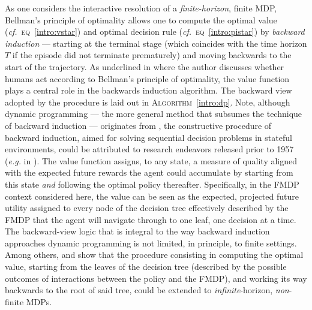 As one considers the interactive resolution of a \emph{finite-horizon}, finite MDP,
Bellman's principle of optimality allows one to compute the optimal value
(\textit{cf.}~\textsc{eq}~\ref{intro:vstar})
and optimal decision rule
(\textit{cf.}~\textsc{eq}~\ref{intro:pistar})
by \emph{backward induction}
--- starting at the terminal stage (which coincides with the time horizon $T$ if the episode did not terminate
prematurely) and moving backwards to the start of the trajectory.
As underlined in \cite{Rust1992-wa}
where the author discusses
whether humans act according to Bellman's principle of optimality,
the value function plays a central role in the backwards induction algorithm.
The backward view adopted by the procedure is laid out in \textsc{Algorithm}~\ref{intro:dp}.
Note, although dynamic programming --- the more general method that subsumes the technique of backward induction ---
originates from \cite{Bellman1957-om}, the constructive procedure of backward induction, aimed
for solving sequential decision problems in stateful environments,
could be attributed to research endeavors released prior to 1957
(\textit{e.g.} in \cite{Wald1947-ts}).
The value function assigns, to any state, a measure of quality aligned with the expected future rewards
the agent could accumulate by starting from this state
\emph{and} following the optimal policy thereafter.
Specifically, in the FMDP context considered here,
the value can be seen as the expected, projected future utility assigned to every node of the decision tree
effectively described by the FMDP that the agent will navigate through to one leaf, one decision at a time.
The backward-view logic that is integral to the way backward induction approaches dynamic programming
is not limited, in principle, to finite settings.
Among others, \cite{Blackwell1962-vg} and \cite{Denardo1967-at}
show that the procedure consisting in computing the optimal value,
starting from the leaves of the decision tree (described by the possible outcomes of interactions between the
policy and the FMDP), and working its way backwards to the root of said tree, could
be extended to \emph{infinite}-horizon, \emph{non}-finite MDPs.

